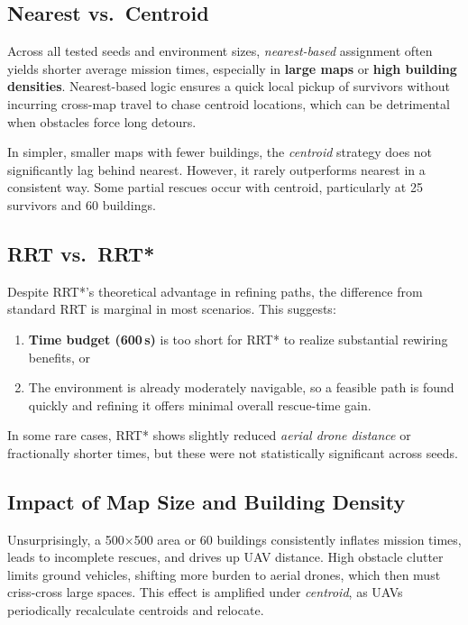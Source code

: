 \documentclass[12pt,a4paper]{report}
\begin{document}
\subsection{Nearest vs.\ Centroid}
Across all tested seeds and environment sizes, \emph{nearest-based} assignment 
often yields shorter average mission times, especially in \textbf{large maps} or 
\textbf{high building densities}. Nearest-based logic ensures a quick local 
pickup of survivors without incurring cross-map travel to chase centroid locations, 
which can be detrimental when obstacles force long detours. 

In simpler, smaller maps with fewer buildings, the \emph{centroid} strategy does not 
significantly lag behind nearest. However, it rarely outperforms nearest in a consistent 
way. Some partial rescues occur with centroid, particularly at 25 survivors and 60 buildings.

\subsection{RRT vs.\ RRT*}
Despite RRT*’s theoretical advantage in refining paths, the difference from standard 
RRT is marginal in most scenarios. This suggests:
\begin{enumerate}
    \item \textbf{Time budget (600\,s)} is too short for RRT* to realize 
          substantial rewiring benefits, or 
    \item The environment is already moderately navigable, so a feasible 
          path is found quickly and refining it offers minimal overall rescue-time gain.
\end{enumerate}
In some rare cases, RRT* shows slightly reduced \emph{aerial drone distance} or fractionally 
shorter times, but these were not statistically significant across seeds.

\subsection{Impact of Map Size and Building Density}
Unsurprisingly, a 500$\times$500 area or 60 buildings consistently inflates mission times, 
leads to incomplete rescues, and drives up UAV distance. High obstacle clutter 
limits ground vehicles, shifting more burden to aerial drones, which then must 
criss-cross large spaces. This effect is amplified under \emph{centroid}, as UAVs 
periodically recalculate centroids and relocate.
\end{document}
